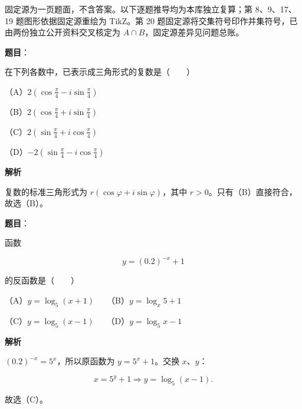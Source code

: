 

\begin{gktip}
固定源为一页题面，不含答案。以下逐题推导均为本库独立复算；第 8、9、17、19 题图形依据固定源重绘为 TikZ。第 20 题固定源将交集符号印作并集符号，已由两份独立公开资料交叉核定为 $A\cap B$，固定源差异见问题总账。
\end{gktip}

\begin{answer}

\textbf{题目}：

在下列各数中，已表示成三角形式的复数是\mbox{（　　）}

（A）$2\left(\cos\frac\pi4-i\sin\frac\pi4\right)$

（B）$2\left(\cos\frac\pi4+i\sin\frac\pi4\right)$

（C）$2\left(\sin\frac\pi4+i\cos\frac\pi4\right)$

（D）$-2\left(\sin\frac\pi4-i\cos\frac\pi4\right)$

\textbf{解析}

复数的标准三角形式为 $r(\cos\varphi+i\sin\varphi)$，其中 $r>0$。只有（B）直接符合，故选（B）。


\end{answer}
\begin{answer}

\textbf{题目}：

函数

\nopagebreak[4]
\[
y=(0.2)^{-x}+1
\]

的反函数是\mbox{（　　）}

（A）$y=\log_5(x+1)$　　（B）$y=\log_x5+1$

（C）$y=\log_5(x-1)$　　（D）$y=\log_5x-1$

\textbf{解析}

$(0.2)^{-x}=5^x$，所以原函数为 $y=5^x+1$。交换 $x\text{、}y$：

\nopagebreak[4]
\[
x=5^y+1
\Longrightarrow y=\log_5(x-1).
\]

故选（C）。


\end{answer}
